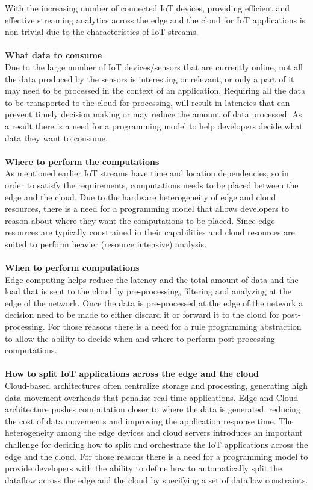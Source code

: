 With the increasing number of connected IoT devices, providing efficient and effective streaming analytics across the edge and the cloud for IoT applications is non-trivial due to the characteristics of IoT streams.
\\\\
\noindent\textbf{What data to consume}
\\
Due to the large number of IoT devices/sensors that are currently online, not all the data produced by the sensors is interesting or relevant, or only a part of it may need to be
processed in the context of an application. Requiring all the data to be transported to the
cloud for processing, will result in latencies that can prevent timely decision making or may reduce the amount of data processed. As a result there is a need for a programming model to help developers decide what data they want to consume.
\\\\
\noindent\textbf{Where to perform the computations}
\\
As mentioned earlier IoT streams have time and location dependencies, so in order to satisfy the requirements, computations needs to be placed between the edge and the cloud. Due to the hardware heterogeneity of edge and cloud resources, there is a need for a programming model that allows developers to reason about where they want the computations to be placed. Since edge resources are typically constrained in their capabilities and cloud resources are suited to perform heavier (resource intensive) analysis.
\\\\
\noindent\textbf{When to perform computations}
\\
Edge computing helps reduce the latency and the total amount of data and the load that is sent to the cloud by pre-processing, filtering and analyzing at the edge of the network. Once the data is pre-processed at the edge of the network a decision need to be made to either discard it or forward it to the cloud for post-processing. For those reasons there is a need for a rule programming abstraction to allow the ability to decide when and where to perform post-processing computations.
\\\\
\noindent\textbf{How to split IoT applications across the edge and the cloud}
\\
Cloud-based architectures often centralize storage and processing, generating high data
movement overheads that penalize real-time applications. Edge and Cloud architecture pushes computation closer to where the data is generated, reducing the cost of data movements and improving the application response time. The heterogeneity among the edge devices and cloud servers introduces an important challenge for deciding how to split and orchestrate the IoT
applications across the edge and the cloud. For those reasons there is a need for a programming model to provide developers with the ability to define how to automatically split the dataflow across the edge and the cloud by specifying a set of dataflow constraints.

